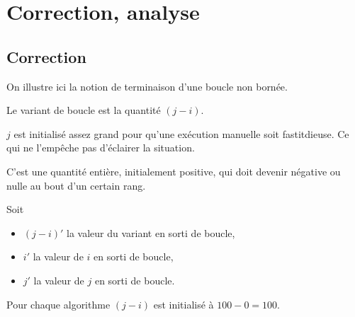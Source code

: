 \documentclass[a4paper,10pt]{article}
\begin{document}
\section{Correction, analyse}

\subsection{Correction}

On illustre ici la notion de terminaison d'une boucle non bornée.

Le variant de boucle est la quantité $(j - i)$.

$j$ est initialisé assez grand pour qu'une exécution manuelle soit fastitdieuse. Ce qui ne l'empêche pas d'éclairer la situation.

C'est une quantité entière, initialement positive, qui doit devenir négative ou nulle au bout d'un certain rang.

Soit 
\begin{itemize}
\item[\textbullet] $(j - i)'$ la valeur du variant en sorti de boucle,
\item[\textbullet] $i'$ la valeur de $i$ en sorti de boucle,
\item[\textbullet] $j'$ la valeur de $j$ en sorti de boucle.
\end{itemize}

Pour chaque algorithme $(j-i)$ est initialisé à $100 - 0 = 100$.
\end{document}
